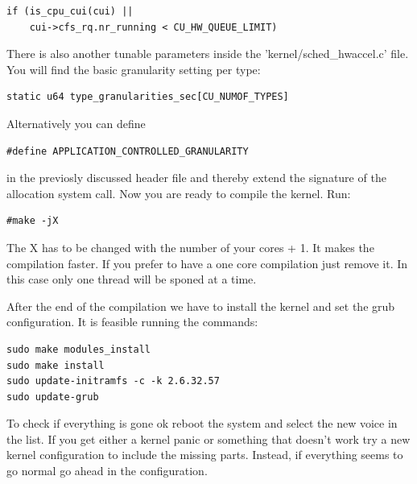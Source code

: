 \documentclass[a4paper,13pt]{article}
\begin{document}
\begin{multicols}{2}
\begin{lstlisting}
if (is_cpu_cui(cui) ||
    cui->cfs_rq.nr_running < CU_HW_QUEUE_LIMIT)
\end{lstlisting}
        
    There is also another tunable parameters inside the 'kernel/sched\_hwaccel.c' file.
    You will find the basic granularity setting per type:
\begin{lstlisting}
static u64 type_granularities_sec[CU_NUMOF_TYPES]
\end{lstlisting}
    Alternatively you can define
\begin{lstlisting}
#define APPLICATION_CONTROLLED_GRANULARITY
\end{lstlisting}
    in the previosly discussed header file and thereby extend the signature of the
    allocation system call.
    Now you are ready to compile the kernel.
    Run:
\begin{lstlisting}
#make -jX
\end{lstlisting}
    The X has to be changed with the number of your cores + 1. It makes the compilation faster. If you prefer to 
    have a one core compilation just remove it. In this case only one thread will be sponed at a time.

    After the end of the compilation we have to install the kernel and set the grub configuration.
    It is feasible running the commands:
\begin{lstlisting}
sudo make modules_install
sudo make install
sudo update-initramfs -c -k 2.6.32.57
sudo update-grub
\end{lstlisting}
    To check if everything is gone ok reboot the system and select the new voice in the list.
    If you get either a kernel panic or something that doesn't work try a new kernel configuration
    to include the missing parts.
    Instead, if everything seems to go normal go ahead in the configuration.

\end{multicols}
\end{document}

